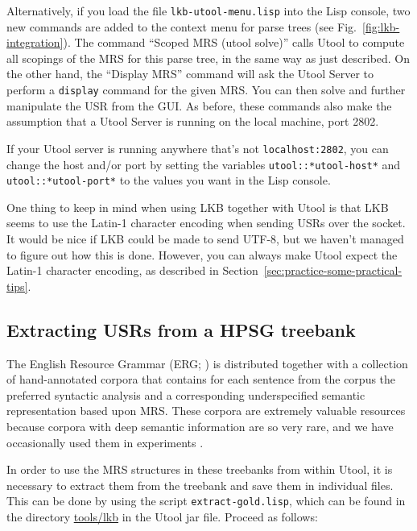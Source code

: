Alternatively, if you load the file \verb|lkb-utool-menu.lisp|
into the Lisp console, two new commands are added to the context menu
for parse trees (see Fig.~\ref{fig:lkb-integration}). The command
``Scoped MRS (utool solve)'' calls Utool to compute all scopings of
the MRS for this parse tree, in the same way as just described. On the
other hand, the ``Display MRS'' command will ask the Utool Server to
perform a \verb?display? command for the given MRS. You can then solve
and further manipulate the USR from the GUI. As before, these commands
also make the assumption that a Utool Server is running on the local
machine, port 2802.

If your Utool server is running anywhere that's not \verb?localhost:2802?, you can change the host and/or port by setting the variables \verb?utool::*utool-host*? and \verb?utool::*utool-port*? to the values you want in the Lisp console.

One thing to keep in mind when using LKB together with Utool is that LKB seems to use the Latin-1 character encoding when sending USRs over the socket. It would be nice if LKB could be made to send UTF-8, but we haven't managed to figure out how this is done. However, you can always make Utool expect the Latin-1 character encoding, as described in Section~\ref{sec:practice-some-practical-tips}.






\subsection{Extracting USRs from a HPSG treebank}
\label{sec:treebank}

The English Resource Grammar (ERG; )
is distributed together with a collection of hand-annotated corpora that contains for each sentence from the corpus
the preferred syntactic analysis and  a corresponding
underspecified semantic representation based upon MRS. These corpora are extremely
valuable resources because corpora with deep semantic information are
so very rare, and we have occasionally used them in experiments
\cite{FucKolNieTha04,FliKolTha05}.

In order to use the MRS structures in these treebanks from within
Utool, it is necessary to extract them from the treebank and save them
in individual files. This can be done by using the script
\verb|extract-gold.lisp|, which can be found in the directory
\url{tools/lkb} in the Utool jar file. Proceed as follows:

